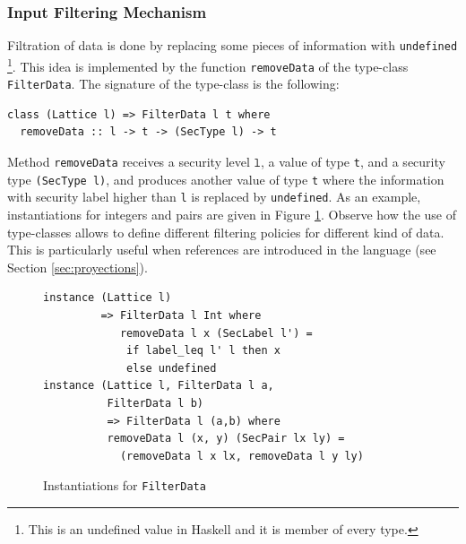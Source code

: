 \documentclass[times, 10pt,twocolumn]{article}
\begin{document}


\subsubsection*{Input Filtering Mechanism}

Filtration of data is done by replacing some pieces of
information with \texttt{undefined}
\footnote{This is an undefined value in Haskell
  and it is member of every type.}. 
This idea is implemented by the function \texttt{removeData} of the
type-class \texttt{FilterData}. 
The signature of the type-class is the
following:
\begin{Verbatim}[fontsize=\footnotesize]
class (Lattice l) => FilterData l t where
  removeData :: l -> t -> (SecType l) -> t
\end{Verbatim}

Method \texttt{removeData} receives a security level $\texttt{l}$, 
a value of type \texttt{t}, and a security type
\texttt{(SecType l)}, and produces another value of type \texttt{t} where 
the information with security label higher than \texttt{l} is 
replaced by \texttt{undefined}. 
As an example, instantiations for 
integers and pairs are given in Figure \ref{fig:FilterData}. 
Observe how the use of type-classes 
allows to define different filtering policies for different kind 
of data. This is particularly useful when references are introduced 
in the language (see Section \ref{sec:proyections}).  

\begin{figure}
\begin{Verbatim}[fontsize=\footnotesize]
instance (Lattice l) 
         => FilterData l Int where
            removeData l x (SecLabel l') =
             if label_leq l' l then x 
             else undefined
instance (Lattice l, FilterData l a, 
          FilterData l b) 
          => FilterData l (a,b) where
          removeData l (x, y) (SecPair lx ly) =
            (removeData l x lx, removeData l y ly)
\end{Verbatim}
\caption{\label{fig:FilterData}Instantiations for \texttt{FilterData}}
\end{figure}
\end{document}
